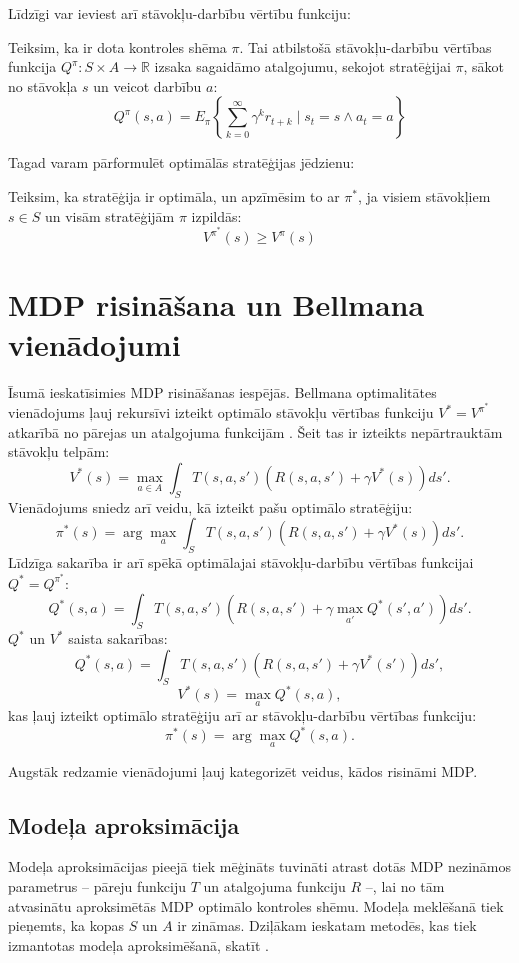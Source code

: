 \documentclass{ludis} %
\begin{document}
Līdzīgi var ieviest arī stāvokļu-darbību vērtību funkciju:
\begin{definicija}
Teiksim, ka ir dota kontroles shēma $\pi$.
Tai atbilstošā stāvokļu-darbību vērtības funkcija $Q^\pi : S \times A \rightarrow \mathbb{R}$ izsaka sagaidāmo atalgojumu, sekojot stratēģijai $\pi$, sākot no stāvokļa $s$ un veicot darbību $a$:
\[
	Q^\pi (s,a) = E_\pi \left\{ \sum_{k=0}^{\infty} \gamma^k r_{t+k} \mid s_t = s \land a_t = a\right\}
\]
\end{definicija}

Tagad varam pārformulēt optimālās stratēģijas jēdzienu:
\begin{definicija}
Teiksim, ka stratēģija ir optimāla, un apzīmēsim to ar $\pi^*$, ja visiem stāvokļiem $s \in S$ un visām stratēģijām $\pi$ izpildās:
\[
	V^{\pi^*}(s) \geq V^{\pi}(s)
\]
\end{definicija}

\section{MDP risināšana un Bellmana vienādojumi}
Īsumā ieskatīsimies MDP risināšanas iespējās.
Bellmana optimalitātes vienādojums ļauj rekursīvi izteikt optimālo stāvokļu vērtības funkciju $V^* = V^{\pi^*}$ atkarībā no pārejas un atalgojuma funkcijām \autocite{Bel}\autocite{Otterlo}\autocite{Hasselt2012}.
Šeit tas ir izteikts nepārtrauktām stāvokļu telpām: 
\[
	V^*(s) = \max_{a\in A} \int_S T(s,a,s')\left(R(s,a,s') + \gamma V^*(s)\right) ds'.
\]
Vienādojums sniedz arī veidu, kā izteikt pašu optimālo stratēģiju:
\begin{equation}
	\pi^*(s) =  \arg \max_{a} \int_S T(s,a,s')\left(R(s,a,s') + \gamma V^*(s)\right) ds'. \label{eq:1}
\end{equation}
Līdzīga sakarība ir arī spēkā optimālajai stāvokļu-darbību vērtības funkcijai $Q^* = Q^{\pi^*}$:
\[
	Q^*(s, a) = \int_S T(s,a,s')\left(R(s,a,s') + \gamma \max_{a'}Q^*(s',a')\right) ds'.
\]
$Q^*$ un $V^*$ saista sakarības:
\[
	Q^*(s, a) = \int_S T(s,a,s')\left(R(s,a,s') + \gamma V^*(s')\right) ds',
\]
\[
	V^*(s) = \max_{a} Q^*(s,a),
\]
kas ļauj izteikt optimālo stratēģiju arī ar stāvokļu-darbību vērtības funkciju:
\begin{equation}
	\pi^*(s) = \arg \max_a Q^*(s, a). \label{eq:2}
\end{equation}

Augstāk redzamie vienādojumi ļauj kategorizēt veidus, kādos risināmi MDP.

\subsection{Modeļa aproksimācija}
Modeļa aproksimācijas pieejā tiek mēģināts tuvināti atrast dotās MDP nezināmos parametrus -- pāreju funkciju $T$ un atalgojuma funkciju $R$ --, lai no tām atvasinātu aproksimētās MDP optimālo kontroles shēmu.
Modeļa meklēšanā tiek pieņemts, ka kopas $S$ un $A$ ir zināmas.
Dziļākam ieskatam metodēs, kas tiek izmantotas modeļa aproksimēšanā, skatīt \autocite{nguyen2011model}.
\end{document}
